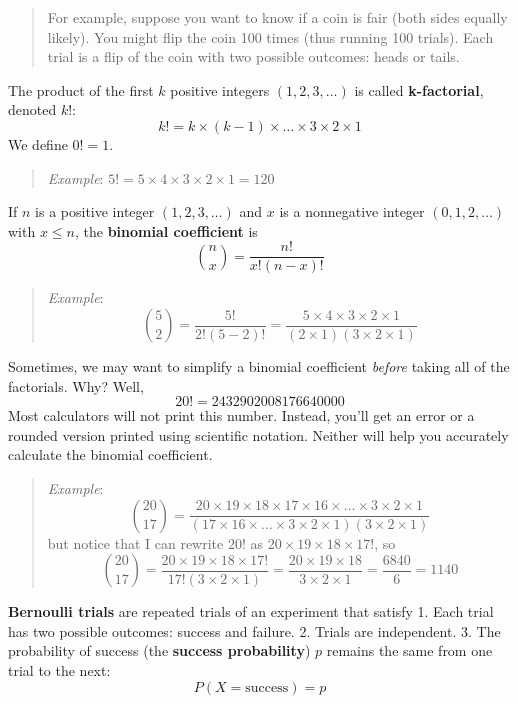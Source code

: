 \documentclass[
]{book}
\begin{document}
\begin{quote}
For example, suppose you want to know if a coin is fair (both sides equally likely). You might flip the coin 100 times (thus running 100 trials). Each trial is a flip of the coin with two possible outcomes: heads or tails.
\end{quote}

The product of the first \(k\) positive integers \((1, 2, 3, \dots)\) is called \textbf{k-factorial}, denoted \(k!\): \[k! = k \times (k-1) \times\dots\times 3 \times 2 \times 1\] We define \(0!=1\).

\begin{quote}
\emph{Example}: \(5! = 5 \times 4 \times 3 \times 2 \times 1 = 120\)
\end{quote}

If \(n\) is a positive integer \((1, 2, 3, \dots)\) and \(x\) is a nonnegative integer \((0, 1, 2, \dots)\) with \(x \le n\), the \textbf{binomial coefficient} is \[\binom{n}{x} = \frac{n!}{x!(n-x)!}\]

\begin{quote}
\emph{Example}: \[\binom{5}{2} = \frac{5!}{2!(5-2)!} = \frac{5 \times 4 \times 3 \times 2 \times 1}{(2 \times 1)(3 \times 2 \times 1)}\]
\end{quote}

Sometimes, we may want to simplify a binomial coefficient \emph{before} taking all of the factorials. Why? Well, \[20! = 2432902008176640000\] Most calculators will not print this number. Instead, you'll get an error or a rounded version printed using scientific notation. Neither will help you accurately calculate the binomial coefficient.

\begin{quote}
\emph{Example}: \[\binom{20}{17} = \frac{20\times 19\times 18\times 17\times 16\times \dots \times 3\times 2\times 1}{(17\times 16\times \dots \times 3\times 2\times 1)(3\times 2\times 1)}\] but notice that I can rewrite \(20!\) as \(20\times 19\times 18\times 17!\), so \[\binom{20}{17} = \frac{20\times 19\times 18\times 17!}{17!(3\times 2\times 1)} = \frac{20\times 19\times 18}{3\times 2\times 1} = \frac{6840}{6} = 1140\]
\end{quote}

\textbf{Bernoulli trials} are repeated trials of an experiment that satisfy
1. Each trial has two possible outcomes: success and failure.
2. Trials are independent.
3. The probability of success (the \textbf{success probability}) \(p\) remains the same from one trial to the next: \[P(X=\text{success})=p\]
\end{document}
